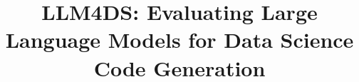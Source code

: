 \documentclass[conference]{IEEEtran}
\begin{document}








\title{LLM4DS: Evaluating Large Language Models for Data Science Code Generation}


\end{document}
